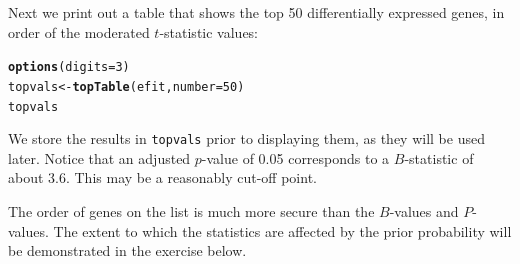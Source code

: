 \documentclass[a4paper,9pt]{article}\usepackage[]{graphicx}\usepackage[]{color}
\makeatletter
\newcommand{\hlnum}[1]{\textcolor[rgb]{0.686,0.059,0.569}{#1}}%
\newcommand{\hlstd}[1]{\textcolor[rgb]{0.345,0.345,0.345}{#1}}%
\newcommand{\hlkwb}[1]{\textcolor[rgb]{0.69,0.353,0.396}{#1}}%
\newcommand{\hlkwc}[1]{\textcolor[rgb]{0.333,0.667,0.333}{#1}}%
\newcommand{\hlkwd}[1]{\textcolor[rgb]{0.737,0.353,0.396}{\textbf{#1}}}%
\newenvironment{kframe}{%
 \def\at@end@of@kframe{}%
 \ifinner\ifhmode%
  \def\at@end@of@kframe{\end{minipage}}%
  \begin{minipage}{\columnwidth}%
 \fi\fi%
 \def\FrameCommand##1{\hskip\@totalleftmargin \hskip-\fboxsep
 \colorbox{shadecolor}{##1}\hskip-\fboxsep
     \hskip-\linewidth \hskip-\@totalleftmargin \hskip\columnwidth}%
 \MakeFramed {\advance\hsize-\width
   \@totalleftmargin\z@ \linewidth\hsize
   \@setminipage}}%
 {\par\unskip\endMakeFramed%
 \at@end@of@kframe}
\newenvironment{knitrout}{}{} %
\makeatother
\begin{document}
Next we print out a table that shows the top 50 differentially
expressed genes, in order of the moderated $t$-statistic values:
\begin{knitrout}
\color{fgcolor}\begin{kframe}
\begin{alltt}
\hlkwd{options}\hlstd{(}\hlkwc{digits} \hlstd{=} \hlnum{3}\hlstd{)}
\hlstd{topvals} \hlkwb{<-} \hlkwd{topTable}\hlstd{(efit,} \hlkwc{number} \hlstd{=} \hlnum{50}\hlstd{)}
\hlstd{topvals}
\end{alltt}
\end{kframe}
\end{knitrout}
We store the results in \texttt{topvals} prior to displaying them,
as they will be used later.  Notice that an adjusted $p$-value of 0.05
corresponds to a $B$-statistic of about 3.6.  This may be a reasonably
cut-off point.

The order of genes on the list is much more secure than the $B$-values
and $P$-values.  The extent to which the statistics are affected by the
prior probability will be demonstrated in the exercise below.
\end{document}
